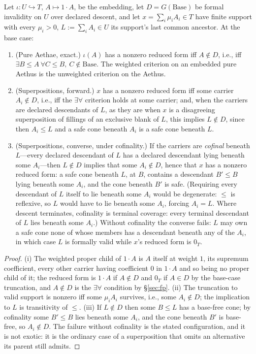 \begin{prop}[Harmonization]
\label{prop:harmonize}
Let $\iota : U \hookrightarrow T$, $A \mapsto 1 \cdot A$, be the embedding, let $D = G(\mathrm{Base})$ be formal invalidity on $U$ over declared descent, and let $x = \sum_{i} \mu_i A_i \in T$ have finite support with every $\mu_i > 0$, $L := \sum_i A_i \in U$ its support's last common ancestor. At the base case:
\begin{enumerate}
\item[(i)] \textup{(Pure Aethae, exact.)} $\iota(A)$ has a nonzero reduced form iff $A \notin D$, i.e., iff $\exists B \le A\ \forall C \le B,\ C \notin \mathrm{Base}$. The weighted criterion on an embedded pure Aethus is the unweighted criterion on the Aethus.
\item[(ii)] \textup{(Superpositions, forward.)} $x$ has a nonzero reduced form iff some carrier $A_i \notin D$, i.e., iff the $\exists\forall$ criterion holds at some carrier; and, when the carriers are declared descendants of $L$, as they are when $x$ is a disagreeing superposition of fillings of an exclusive blank of $L$, this implies $L \notin D$, since then $A_i \le L$ and a safe cone beneath $A_i$ is a safe cone beneath $L$.
\item[(iii)] \textup{(Superpositions, converse, under cofinality.)} If the carriers are \emph{cofinal} beneath $L$---every declared descendant of $L$ has a declared descendant lying beneath some $A_i$---then $L \notin D$ implies that some $A_i \notin D$, hence that $x$ has a nonzero reduced form: a safe cone beneath $L$, at $B$, contains a descendant $B' \le B$ lying beneath some $A_i$, and the cone beneath $B'$ is safe. (Requiring every descendant of $L$ itself to lie beneath some $A_i$ would be degenerate: $\le$ is reflexive, so $L$ would have to lie beneath some $A_i$, forcing $A_i = L$. Where descent terminates, cofinality is terminal coverage: every terminal descendant of $L$ lies beneath some $A_i$.) Without cofinality the converse fails: $L$ may own a safe cone none of whose members has a descendant beneath any of the $A_i$, in which case $L$ is formally valid while $x$'s reduced form is $0_T$.
\end{enumerate}
\end{prop}
\begin{proof}
(i) The weighted proper child of $1 \cdot A$ is $A$ itself at weight $1$, its supremum coefficient, every other carrier having coefficient $0$ in $1 \cdot A$ and so being no proper child of it; the reduced form is $1 \cdot A$ if $A \notin D$ and $0_T$ if $A \in D$ by the base-case truncation, and $A \notin D$ is the $\exists\forall$ condition by §\ref{sec:fp}. (ii) The truncation to valid support is nonzero iff some $\mu_i A_i$ survives, i.e., some $A_i \notin D$; the implication to $L$ is transitivity of $\le$. (iii) If $L \notin D$ then some $B \le L$ has a base-free cone; by cofinality some $B' \le B$ lies beneath some $A_i$, and the cone beneath $B'$ is base-free, so $A_i \notin D$. The failure without cofinality is the stated configuration, and it is not exotic: it is the ordinary case of a superposition that omits an alternative its parent still admits.
\end{proof}



